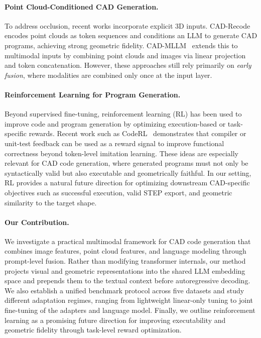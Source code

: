 \documentclass{article}
\begin{document}
\paragraph{Point Cloud-Conditioned CAD Generation.}
To address occlusion, recent works incorporate explicit 3D inputs. CAD-Recode~\cite{cadrecode} encodes point clouds as token sequences and conditions an LLM to generate CAD programs, achieving strong geometric fidelity. CAD-MLLM~\cite{cadmllm} extends this to multimodal inputs by combining point clouds and images via linear projection and token concatenation. However, these approaches still rely primarily on \emph{early fusion}, where modalities are combined only once at the input layer.

\paragraph{Reinforcement Learning for Program Generation.}
Beyond supervised fine-tuning, reinforcement learning (RL) has been used to improve code and program generation by optimizing execution-based or task-specific rewards. Recent work such as CodeRL~\cite{le2022coderl} demonstrates that compiler or unit-test feedback can be used as a reward signal to improve functional correctness beyond token-level imitation learning. These ideas are especially relevant for CAD code generation, where generated programs must not only be syntactically valid but also executable and geometrically faithful. In our setting, RL provides a natural future direction for optimizing downstream CAD-specific objectives such as successful execution, valid STEP export, and geometric similarity to the target shape.

\paragraph{Our Contribution.}
We investigate a practical multimodal framework for CAD code generation that combines image features, point cloud features, and language modeling through prompt-level fusion. Rather than modifying transformer internals, our method projects visual and geometric representations into the shared LLM embedding space and prepends them to the textual context before autoregressive decoding. We also establish a unified benchmark protocol across five datasets and study different adaptation regimes, ranging from lightweight linear-only tuning to joint fine-tuning of the adapters and language model. Finally, we outline reinforcement learning as a promising future direction for improving executability and geometric fidelity through task-level reward optimization.
\end{document}
